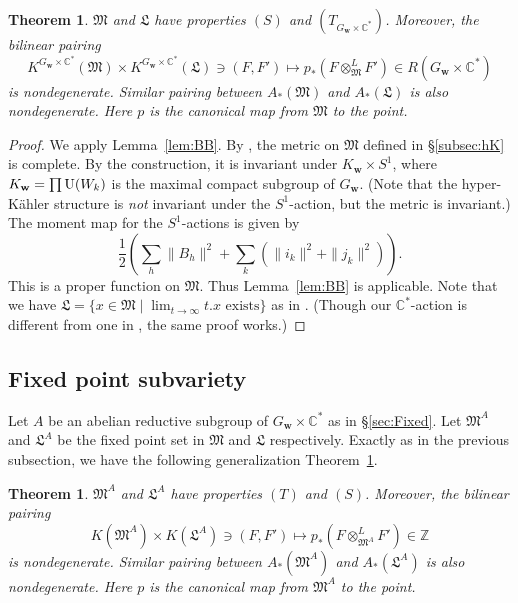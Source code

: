 \documentclass[12pt]{amsart}
\def\Bbb{\mathbb}
\def\frak{\mathfrak}
\newtheorem{Theorem}[equation]{Theorem}
\theoremstyle{definition}
\theoremstyle{remark}
\numberwithin{equation}{subsection}
\newcommand{\thmref}[1]{Theorem~\ref{#1}}
\newcommand{\secref}[1]{\S\ref{#1}}
\newcommand{\lemref}[1]{Lemma~\ref{#1}}
\newcommand{\subsecref}[1]{\S\ref{#1}}
\newcommand{\C}{{\Bbb C}}
\newcommand{\Z}{{\Bbb Z}}
\newcommand{\U}{\operatorname{\rm U}}
\newcommand{\M}{{\frak M}} %
\newcommand{\La}{{\frak L}} %
\newcommand{\bw}{{\mathbf w}} %
\begin{document}
\begin{Theorem}\label{thm:freeness}
$\M$ and $\La$ have properties $(S)$ and $(T_{G_\bw\times\C^*})$.
%
Moreover, the bilinear pairing
\begin{equation*}
   K^{G_\bw\times\C^*}(\M) \times K^{G_\bw\times\C^*}(\La) \ni (F, F') 
   \longmapsto p_*(F\otimes^L_{\M} F')\in R(G_\bw\times\C^*)
\end{equation*}
is nondegenerate. Similar pairing between $A_*(\M)$ and $A_*(\La)$ is
also nondegenerate.
Here $p$ is the canonical map from $\M$ to the point.
\end{Theorem}

\begin{proof}
We apply \lemref{lem:BB}. By \cite[2.8]{Na-quiver}, the metric on $\M$ 
defined in \subsecref{subsec:hK} is complete. By the construction, it
is invariant under $K_\bw\times S^1$, where $K_\bw = \prod \U(W_k)$ is 
the maximal compact subgroup of $G_\bw$.
(Note that the hyper-K\"ahler structure is {\it not\/} invariant under 
the $S^1$-action, but the metric is invariant.) The moment map for the
$S^1$-actions is given by
\begin{equation*}
   \frac12 \left( \sum_h \| B_h \|^2 
     + \sum_k \left( \| i_k\|^2 + \| j_k \|^2 \right) \right).
\end{equation*}
This is a proper function on $\M$. Thus \lemref{lem:BB} is
applicable. Note that we have
\(
   \La = \{ x\in \M \mid
   \text{$\displaystyle\lim_{t\to\infty} t.x$ exists} \}
\)
as in \cite[5.8]{Na-quiver}. (Though our $\C^*$-action is different
from one in \cite{Na-quiver}, the same proof works.)
\end{proof}

\subsection{Fixed point subvariety}
Let $A$ be an abelian reductive subgroup of $G_\bw\times\C^*$ as in
\secref{sec:Fixed}. Let $\M^A$ and $\La^A$ be the fixed point set in
$\M$ and $\La$ respectively. Exactly as in the previous subsection, we
have the following generalization \thmref{thm:freeness}.
\begin{Theorem}\label{thm:freeness'}
$\M^A$ and $\La^A$ have properties $(T)$ and $(S)$.
Moreover, the bilinear pairing
\begin{equation*}
   K(\M^A) \times K(\La^A) \ni (F, F') 
   \longmapsto p_*(F\otimes^L_{\M^A} F')\in \Z
\end{equation*}
is nondegenerate. Similar pairing between $A_*(\M^A)$ and $A_*(\La^A)$ is
also nondegenerate.
Here $p$ is the canonical map from $\M^A$ to the point.
\end{Theorem}
\end{document}
